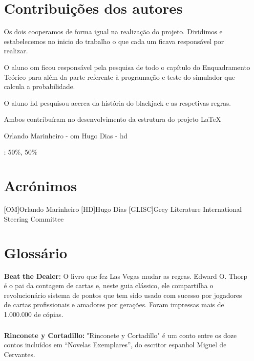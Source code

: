 \documentclass{report}
\begin{document}
\chapter*{Contribuições dos autores}

Os dois cooperamos de forma igual na realização do projeto. Dividimos e estabelecemos no inicio do trabalho o que cada um ficava responsável por realizar. \newline

O aluno \ac{om} ficou responsável pela pesquisa de todo o capítulo do Enquadramento Teórico para além da parte referente à programação e teste do simulador que calcula a probabilidade. \newline

O aluno \ac{hd} pesquisou acerca da história do blackjack e as respetivas regras. \newline

Ambos contribuíram no desenvolvimento da estrutura do projeto \LaTeX \newline

Orlando Marinheiro - \ac{om}
Hugo Dias - \ac{hd}
\vspace{10pt}

\autores : 50\%, 50\%\\

\chapter*{Acrónimos}
\begin{acronym}
[OM]{Orlando Marinheiro}
[HD]{Hugo Dias}
[GLISC]{Grey Literature International Steering Committee}
\end{acronym}

\chapter*{Glossário}

\hypertarget{Glossário}{\textbf{Beat the Dealer:} O livro que fez Las Vegas mudar as regras. Edward O. Thorp é o pai da contagem de cartas e, neste guia clássico, ele compartilha o revolucionário sistema de pontos que tem sido usado com sucesso por jogadores de cartas profissionais e amadores por gerações.
Foram impressas mais de 1.000.000 de cópias.}
\newline
\paragraph{}\hypertarget{Glossário}{\textbf{Rinconete y Cortadillo:} "Rinconete y Cortadillo" é um conto entre os doze contos incluídos em “Novelas Exemplares”, do escritor espanhol Miguel de Cervantes.}
\end{document}
